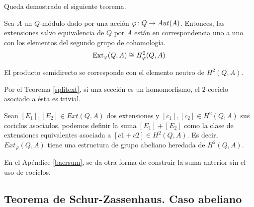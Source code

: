 Queda demostrado el siguiente teorema. %

\begin{teorema}\label{h2}
	Sea $A$ un $Q$-módulo dado por una acción $\varphi\colon Q\to Aut(A)$. Entonces, las extensiones salvo equivalencia de $Q$ por $A$ están en correspondencia uno a uno con los elementos del segundo grupo de cohomología.
	\begin{equation*}
		\operatorname{Ext}_{\varphi}(Q,A)\cong H^2_{\varphi}(Q,A)
	\end{equation*}
\end{teorema}

\begin{observacion}\label{obs:split}
	El producto semidirecto se corresponde con el elemento neutro de $H^2(Q,A)$.
	\begin{demostracion}
		Por el Teorema \ref{splitext}, si una sección es un homomorfismo, el $2$-cociclo asociado a ésta es trivial.
	\end{demostracion}
\end{observacion}

\begin{proposicion}\label{extsum}
	Sean $[E_1],[E_2]\in Ext(Q,A)$ dos extensiones y $[c_1],[c_2]\in H^2(Q,A)$ sus cociclos asociados, podemos definir la suma $[E_1] + [E_2]$ como la clase de extensiones equivalentes asociada a $[c1+c2]\in H^2(Q,A)$. Es decir, $Ext_\varphi(Q,A)$ tiene una estructura de grupo abeliano heredada de $H^2(Q,A)$.
\end{proposicion}

En el Apéndice \ref{baersum}, se da otra forma de construir la suma anterior sin el uso de cociclos.

\subsection{Teorema de Schur-Zassenhaus. Caso abeliano}

